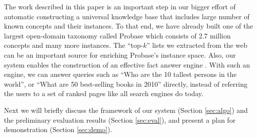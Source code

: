 The work described in this paper is an important step in our bigger effort of 
automatic constructing a universal knowledge base 
that includes large number of known concepts and their instances. 
To that end, we have already built one of the largest open-domain taxonomy 
called Probase \cite{WuLWZ12:Probase,WangLWZ12:Topic,WangWWZ12:Tables,Song11:Conceptualize} 
which consists of 2.7 million concepts and many more instances. 
The ``top-$k$'' lists we extracted from the web can be an important source 
for enriching Probase's instance space.
Also, our system enables the construction of
an effective fact answer engine \cite{YinTL11:Facto}. 
With such an engine, we can answer queries such as
``Who are the 10 tallest persons in the world'', or ``What are 50 best-selling
books in 2010'' directly, instead of referring the users to a set of ranked
pages like all search engines do today. 

Next we will briefly discuss the framework of our system 
(Section \ref{sec:algo}) and the preliminary evaluation results 
(Section \ref{sec:eval}), and present a plan for demonstration (Section
\ref{sec:demo}).  
